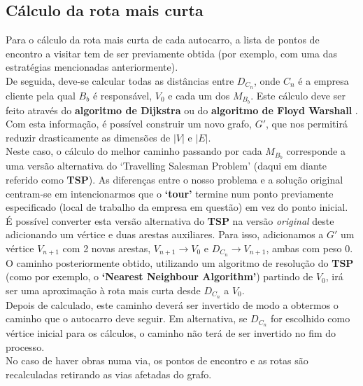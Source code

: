 \documentclass{report}
\begin{document}
    \subsection{Cálculo da rota mais curta}
      Para o cálculo da rota mais curta de cada autocarro, a lista de pontos de
      encontro a visitar tem de ser previamente obtida (por exemplo, com uma das
      estratégias mencionadas anteriormente).\\
      De seguida, deve-se calcular todas as distâncias entre $D_{C_n}$, onde
      $C_n$ é a empresa cliente pela qual $B_b$ é responsável, $V_0$ e cada um
      dos $M_{B_b}$. Este cálculo deve ser feito através do \textbf{algoritmo
      de Dijkstra}\cite{DIJKSTRA} ou do \textbf{algoritmo de Floyd Warshall}
      \cite{FLOYD}. Com esta informação, é possível construir um novo grafo,
      $G'$, que nos permitirá reduzir drasticamente as dimensões de
      $|V|$ e $|E|$.\\
      \newline
      Neste caso, o cálculo do melhor caminho passando por cada $M_{B_b}$
      corresponde a uma versão alternativa do `Travelling Salesman Problem'\cite{TSP}
      (daqui em diante referido como \textbf{TSP}). As diferenças entre o nosso
      problema e a solução original centram-se em intencionarmos que o
      \textbf{`tour'} termine num ponto previamente especificado (local de
      trabalho da empresa em questão) em vez do ponto inicial.\\
      É possível converter esta versão alternativa do \textbf{TSP} na versão
      \textit{original} deste adicionando um vértice e duas arestas auxiliares.
      Para isso, adicionamos a $G'$ um vértice $V_{n+1}$ com 2 novas arestas,
      $V_{n+1} \rightarrow V_0$ e $D_{C_n} \rightarrow V_{n+1}$, ambas com peso 0.\\
      O caminho posteriormente obtido, utilizando um algoritmo de resolução do
      \textbf{TSP} (como por exemplo, o \textbf{`Nearest Neighbour Algorithm'})
      partindo de $V_0$, irá ser uma aproximação à rota mais curta desde $D_{C_n}$
      a $V_0$.\\
      Depois de calculado, este caminho deverá ser invertido de modo a obtermos
      o caminho que o autocarro deve seguir. Em alternativa, se $D_{C_n}$ for
      escolhido como vértice inicial para os cálculos, o caminho não terá de ser
      invertido no fim do processo.\\
      No caso de haver obras numa via, os pontos de encontro e as rotas são
      recalculadas retirando as vias afetadas do grafo.
\end{document}
